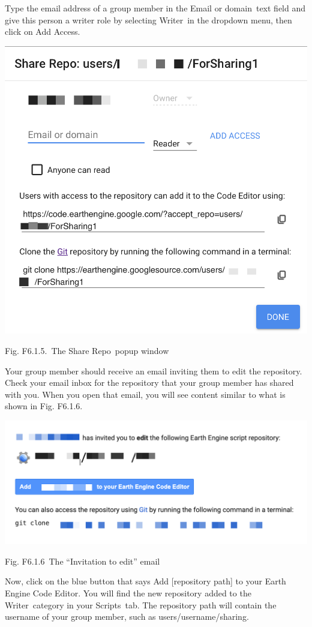 \documentclass[
  letterpaper,
  DIV=11,
  numbers=noendperiod]{scrreprt}
\begin{document}
Type the email address of a group member in the Email or domain~text
field and give this person a writer role by selecting Writer~in the
dropdown menu, then click on Add Access.~

\includegraphics{./F6/image29.png}

Fig. F6.1.5.~The Share Repo~popup window

Your group member should receive an email inviting them to edit the
repository. Check your email inbox for the repository that your group
member has shared with you. When you open that email, you will see
content similar to what is shown in Fig. F6.1.6.

\includegraphics{./F6/image50.png}

Fig. F6.1.6~The ``Invitation to edit'' email

Now, click on the blue button that says Add {[}repository path{]} to
your Earth Engine Code Editor. You will find the new repository added to
the Writer~category in your Scripts~tab. The repository path will
contain the username of your group member, such as
users/username/sharing.
\end{document}
